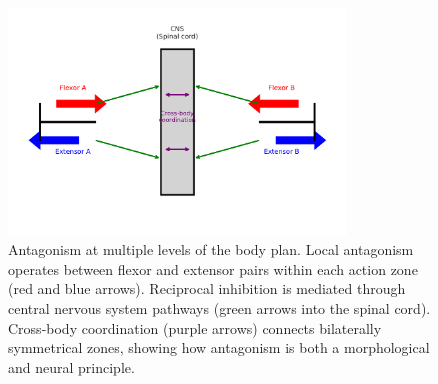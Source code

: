 \begin{figure}[htbp]
  \centering
  \includegraphics[width=0.8\textwidth]{graphics/smn_antagonism_bilateral_cns.pdf}
  \caption{%
    Antagonism at multiple levels of the body plan. 
    Local antagonism operates between flexor and extensor pairs within each action zone (red and blue arrows). 
    Reciprocal inhibition is mediated through central nervous system pathways (green arrows into the spinal cord). 
    Cross-body coordination (purple arrows) connects bilaterally symmetrical zones, showing how antagonism is both a morphological and neural principle.%
  }
  \label{fig:smn-antagonism}
\end{figure}
